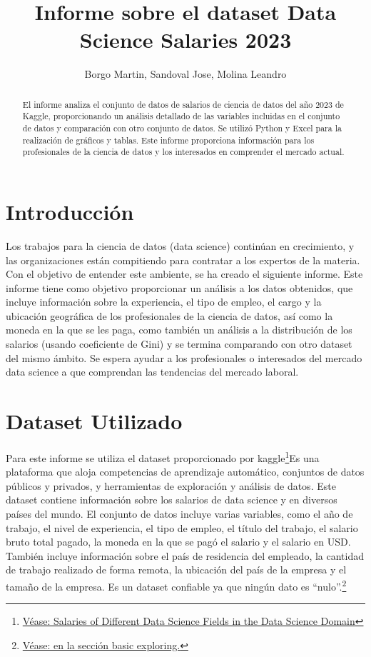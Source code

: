 \documentclass{article}
\title{Informe sobre el dataset Data Science Salaries 2023}
\author{Borgo Martin, Sandoval Jose, Molina Leandro}
\begin{document}
	
	\maketitle
	\begin{abstract}
		El informe analiza el conjunto de datos de salarios de ciencia de datos del año 2023 de Kaggle, proporcionando un análisis detallado de las variables incluidas en el conjunto de datos y comparación con otro conjunto de datos. Se utilizó Python y Excel para la realización de gráficos y tablas. Este informe proporciona información para los profesionales de la ciencia de datos y los interesados en comprender el mercado actual.
	\end{abstract}
	\pagebreak
	\vspace{-20pt}
	
	\noindent
	\tableofcontents
	\cite{0}
	\pagebreak
	\section{Introducción}
	Los trabajos para la ciencia de datos (data science) continúan en crecimiento, y las organizaciones están compitiendo para contratar a los expertos de la materia. Con el objetivo de entender este ambiente, se ha creado el siguiente informe. Este informe tiene como objetivo proporcionar un análisis a los datos obtenidos, que incluye información sobre la experiencia, el tipo de empleo, el cargo y la ubicación geográfica de los profesionales de la ciencia de datos, así como la moneda en la que se les paga, como también un análisis a la distribución de los salarios (usando coeficiente de Gini) y se termina comparando con otro dataset del mismo ámbito. Se espera ayudar a los profesionales o interesados del mercado data science a que comprendan las tendencias del mercado laboral.
	\section{Dataset Utilizado}
	Para este informe se utiliza el dataset proporcionado por kaggle\footnote{\href{https://www.kaggle.com/datasets/arnabchaki/data-science-salaries-2023}{Véase: Salaries of Different Data Science Fields in the Data Science Domain}}Es una plataforma que aloja competencias de aprendizaje automático, conjuntos de datos públicos y privados, y herramientas de exploración y análisis de datos. Este dataset contiene información sobre los salarios de data science y en diversos países del mundo. El conjunto de datos incluye varias variables, como el año de trabajo, el nivel de experiencia, el tipo de empleo, el título del trabajo, el salario bruto total pagado, la moneda en la que se pagó el salario y el salario en USD. También incluye información sobre el país de residencia del empleado, la cantidad de trabajo realizado de forma remota, la ubicación del país de la empresa y el tamaño de la empresa. Es un dataset confiable ya que ningún dato es “nulo”.\footnote{ \href{https://www.kaggle.com/code/mudassarshaheen/data-science-salaries-eda-visualization}{Véase: en la sección basic exploring.}}
	
\end{document}
